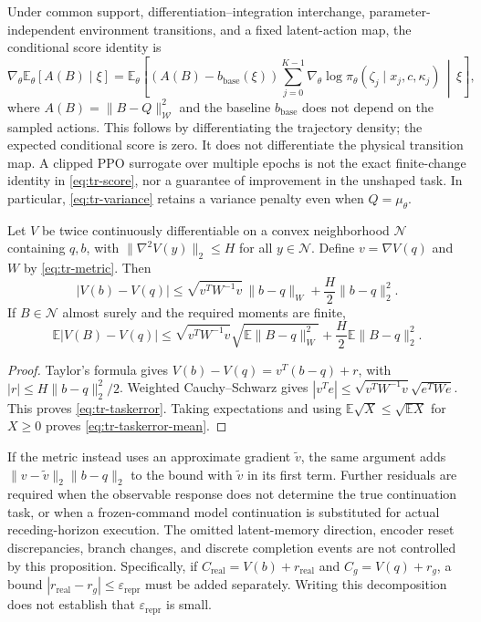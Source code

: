Under common support, differentiation--integration interchange,
parameter-independent environment transitions, and a fixed latent-action
map, the conditional score identity is
\begin{equation}
 \nabla_\theta\mathbb E_\theta[A(B)\mid\xi]
 =\mathbb E_\theta\left[
 (A(B)-b_{\mathrm{base}}(\xi))\sum_{j=0}^{K-1}
 \nabla_\theta\log\pi_\theta(\zeta_j\mid x_j,c,\kappa_j)
 \,\middle|\,\xi\right],
 \label{eq:tr-score}
\end{equation}
where $A(B)=\|B-Q\|_{\mathcal W}^2$ and the baseline $b_{\mathrm{base}}$ does not
depend on the sampled actions. This follows by differentiating the
trajectory density; the expected conditional score is zero. It does not
differentiate the physical transition map. A clipped PPO surrogate over
multiple epochs is not the exact finite-change identity in
\eqref{eq:tr-score}, nor a guarantee of improvement in the unshaped task.
In particular, \eqref{eq:tr-variance} retains a variance penalty even when
$Q=\mu_\theta$.

\begin{proposition}
\label{prop:tr-taskerror}
Let $V$ be twice continuously differentiable on a convex neighborhood
$\mathcal N$ containing $q,b$, with
$\|\nabla^2V(y)\|_2\le H$ for all $y\in\mathcal N$. Define
$v=\nabla V(q)$ and $W$ by \eqref{eq:tr-metric}. Then
\begin{equation}
 |V(b)-V(q)|
 \le\sqrt{v^TW^{-1}v}\,\|b-q\|_W
       +\frac H2\|b-q\|_2^2.
 \label{eq:tr-taskerror}
\end{equation}
If $B\in\mathcal N$ almost surely and the required moments are finite,
\begin{equation}
 \mathbb E|V(B)-V(q)|
 \le\sqrt{v^TW^{-1}v}\sqrt{\mathbb E\|B-q\|_W^2}
       +\frac H2\mathbb E\|B-q\|_2^2.
 \label{eq:tr-taskerror-mean}
\end{equation}
\end{proposition}
\begin{proof}
Taylor's formula gives $V(b)-V(q)=v^T(b-q)+r$, with
$|r|\le H\|b-q\|_2^2/2$. Weighted Cauchy--Schwarz gives
$|v^Te|\le\sqrt{v^TW^{-1}v}\sqrt{e^TWe}$. This proves
\eqref{eq:tr-taskerror}. Taking expectations and using
$\mathbb E\sqrt X\le\sqrt{\mathbb EX}$ for $X\ge0$ proves
\eqref{eq:tr-taskerror-mean}.
\end{proof}

If the metric instead uses an approximate gradient $\tilde v$, the
same argument adds $\|v-\tilde v\|_2\|b-q\|_2$ to the bound with
$\tilde v$ in its first term. Further residuals are required when the
observable response does not determine the true continuation task, or
when a frozen-command model continuation is substituted for actual
receding-horizon execution. The omitted latent-memory direction, encoder
reset discrepancies, branch changes, and discrete completion events are
not controlled by this proposition.
Specifically, if $C_{\mathrm{real}}=V(b)+r_{\mathrm{real}}$ and
$C_g=V(q)+r_g$, a bound
$|r_{\mathrm{real}}-r_g|\le\varepsilon_{\mathrm{repr}}$ must be added
separately. Writing this decomposition does not establish that
$\varepsilon_{\mathrm{repr}}$ is small.

